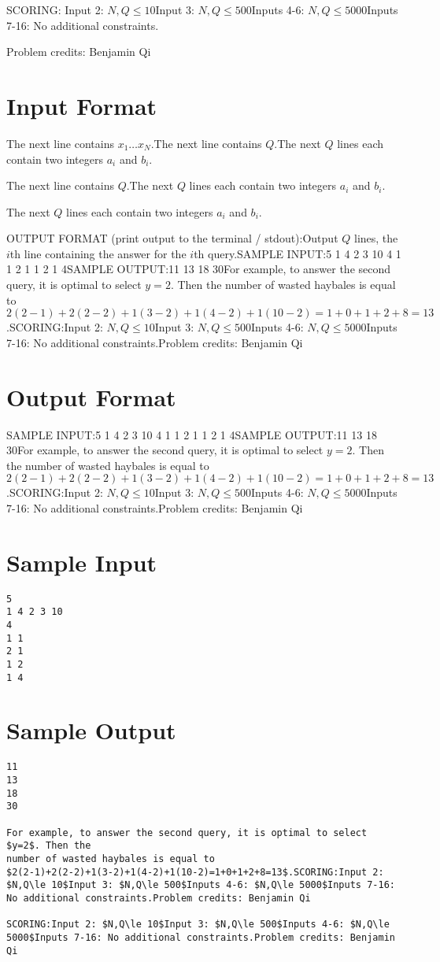 \documentclass[12pt]{article}
\begin{document}
SCORING:
Input 2: $N,Q\le 10$Input 3: $N,Q\le 500$Inputs 4-6: $N,Q\le 5000$Inputs 7-16: No additional constraints.


Problem credits: Benjamin Qi



\section*{Input Format}
The next line contains $x_1\dots x_N$.The next line contains $Q$.The next $Q$ lines each contain two integers $a_i$ and $b_i$.

The next line contains $Q$.The next $Q$ lines each contain two integers $a_i$ and $b_i$.

The next $Q$ lines each contain two integers $a_i$ and $b_i$.

OUTPUT FORMAT (print output to the terminal / stdout):Output $Q$ lines, the $i$th line containing the answer for the $i$th query.SAMPLE INPUT:5
1 4 2 3 10
4
1 1
2 1
1 2
1 4SAMPLE OUTPUT:11
13
18
30For example, to answer the second query, it is optimal to select $y=2$. Then the
number of wasted haybales is equal to
$2(2-1)+2(2-2)+1(3-2)+1(4-2)+1(10-2)=1+0+1+2+8=13$.SCORING:Input 2: $N,Q\le 10$Input 3: $N,Q\le 500$Inputs 4-6: $N,Q\le 5000$Inputs 7-16: No additional constraints.Problem credits: Benjamin Qi

\section*{Output Format}
SAMPLE INPUT:5
1 4 2 3 10
4
1 1
2 1
1 2
1 4SAMPLE OUTPUT:11
13
18
30For example, to answer the second query, it is optimal to select $y=2$. Then the
number of wasted haybales is equal to
$2(2-1)+2(2-2)+1(3-2)+1(4-2)+1(10-2)=1+0+1+2+8=13$.SCORING:Input 2: $N,Q\le 10$Input 3: $N,Q\le 500$Inputs 4-6: $N,Q\le 5000$Inputs 7-16: No additional constraints.Problem credits: Benjamin Qi

\section*{Sample Input}
\begin{verbatim}
5
1 4 2 3 10
4
1 1
2 1
1 2
1 4
\end{verbatim}

\section*{Sample Output}
\begin{verbatim}
11
13
18
30

For example, to answer the second query, it is optimal to select $y=2$. Then the
number of wasted haybales is equal to
$2(2-1)+2(2-2)+1(3-2)+1(4-2)+1(10-2)=1+0+1+2+8=13$.SCORING:Input 2: $N,Q\le 10$Input 3: $N,Q\le 500$Inputs 4-6: $N,Q\le 5000$Inputs 7-16: No additional constraints.Problem credits: Benjamin Qi

SCORING:Input 2: $N,Q\le 10$Input 3: $N,Q\le 500$Inputs 4-6: $N,Q\le 5000$Inputs 7-16: No additional constraints.Problem credits: Benjamin Qi
\end{verbatim}
\end{document}
